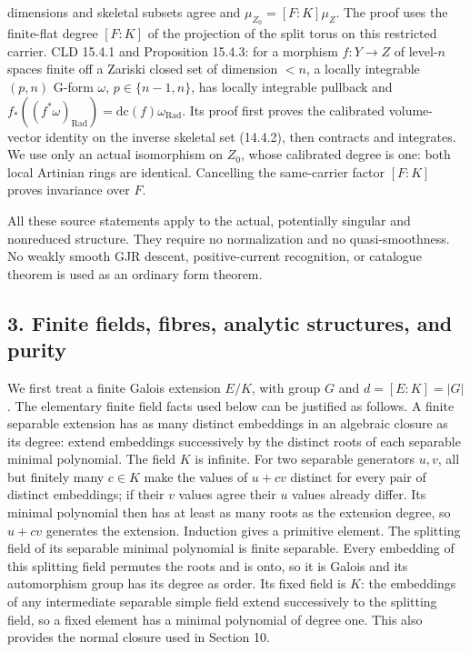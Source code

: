 \documentclass[11pt]{article}
\begin{document}
\begin{enumerate}
  dimensions and skeletal subsets agree and \(\mu_{Z_0}=[F:K]\mu_Z\).
  The proof uses the finite-flat degree \([F:K]\) of the projection of
  the split torus on this restricted carrier. CLD 15.4.1 and Proposition
  15.4.3: for a morphism \(f:Y\to Z\) of level-\(n\) spaces finite off a
  Zariski closed set of dimension \(<n\), a locally integrable \((p,n)\)
  G-form \(\omega\), \(p\in\{n-1,n\}\), has locally integrable pullback
  and
  \(f_*((f^*\omega)_{\mathrm{Rad}})=\mathrm{dc}(f)\omega_{\mathrm{Rad}}\).
  Its proof first proves the calibrated volume-vector identity on the
  inverse skeletal set (14.4.2), then contracts and integrates. We use
  only an actual isomorphism on \(Z_0\), whose calibrated degree is one:
  both local Artinian rings are identical. Cancelling the same-carrier
  factor \([F:K]\) proves invariance over \(F\).
\end{enumerate}

All these source statements apply to the actual, potentially singular
and nonreduced structure. They require no normalization and no
quasi-smoothness. No weakly smooth GJR descent, positive-current
recognition, or catalogue theorem is used as an ordinary form theorem.

\subsection{3. Finite fields, fibres, analytic structures, and
purity}\label{finite-fields-fibres-analytic-structures-and-purity}

We first treat a finite Galois extension \(E/K\), with group \(G\) and
\(d=[E:K]=|G|\). The elementary finite field facts used below can be
justified as follows. A finite separable extension has as many distinct
embeddings in an algebraic closure as its degree: extend embeddings
successively by the distinct roots of each separable minimal polynomial.
The field \(K\) is infinite. For two separable generators \(u,v\), all
but finitely many \(c\in K\) make the values of \(u+cv\) distinct for
every pair of distinct embeddings; if their \(v\) values agree their
\(u\) values already differ. Its minimal polynomial then has at least as
many roots as the extension degree, so \(u+cv\) generates the extension.
Induction gives a primitive element. The splitting field of its
separable minimal polynomial is finite separable. Every embedding of
this splitting field permutes the roots and is onto, so it is Galois and
its automorphism group has its degree as order. Its fixed field is
\(K\): the embeddings of any intermediate separable simple field extend
successively to the splitting field, so a fixed element has a minimal
polynomial of degree one. This also provides the normal closure used in
Section 10.
\end{document}
